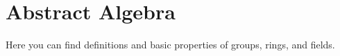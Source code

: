\chapter{Abstract Algebra}
Here you can find definitions and basic properties of groups, rings, and fields.






